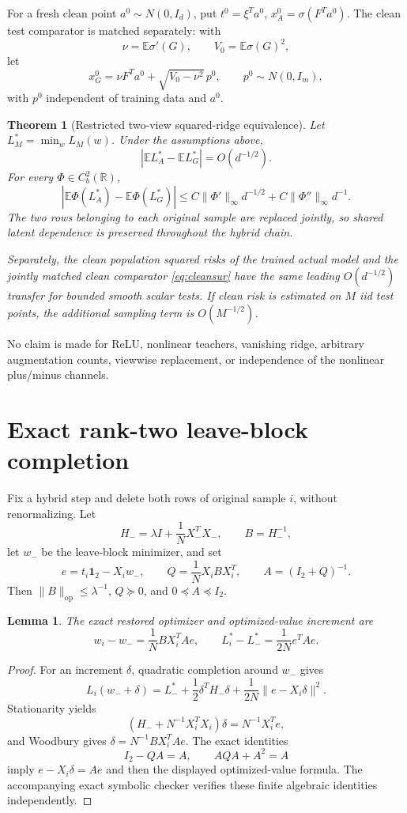\documentclass[11pt]{article}
\newtheorem{theorem}{Theorem}
\newtheorem{lemma}{Lemma}
\newcommand{\E}{\mathbb E}
\newcommand{\R}{\mathbb R}
\newcommand{\op}{\mathrm{op}}
\begin{document}
For a fresh clean point \(a^0\sim N(0,I_d)\), put \(t^0=\xi^Ta^0\), \(x_A^0=\sigma(F^Ta^0)\).  The clean test comparator is matched separately: with
\[
 \nu=\E\sigma'(G),\qquad V_0=\E\sigma(G)^2,
\]
let
\begin{equation}\label{eq:cleansur}
 x_G^0=\nu F^Ta^0+\sqrt{V_0-\nu^2}\,p^0,
 \qquad p^0\sim N(0,I_m),
\end{equation}
with \(p^0\) independent of training data and \(a^0\).

\begin{theorem}[Restricted two-view squared-ridge equivalence]\label{thm:main}
Let \(L_M^*=\min_w L_M(w)\).  Under the assumptions above,
\[
 |\E L_A^*-\E L_G^*|=O(d^{-1/2}).
\]
For every \(\Phi\in C_b^2(\R)\),
\[
 |\E\Phi(L_A^*)-\E\Phi(L_G^*)|
 \le C\|\Phi'\|_\infty d^{-1/2}+C\|\Phi''\|_\infty d^{-1}.
\]
The two rows belonging to each original sample are replaced jointly, so shared latent dependence is preserved throughout the hybrid chain.

Separately, the clean population squared risks of the trained actual model and the jointly matched clean comparator \eqref{eq:cleansur} have the same leading \(O(d^{-1/2})\) transfer for bounded smooth scalar tests.  If clean risk is estimated on \(M\) iid test points, the additional sampling term is \(O(M^{-1/2})\).
\end{theorem}

No claim is made for ReLU, nonlinear teachers, vanishing ridge, arbitrary augmentation counts, viewwise replacement, or independence of the nonlinear plus/minus channels.

\section{Exact rank-two leave-block completion}
Fix a hybrid step and delete both rows of original sample \(i\), without renormalizing.  Let
\[
 H_-=\lambda I+\frac1N X_-^TX_-,\qquad B=H_-^{-1},
\]
let \(w_-\) be the leave-block minimizer, and set
\[
 e=t_i\mathbf1_2-X_iw_-,\qquad Q=\frac1N X_iBX_i^T,\qquad A=(I_2+Q)^{-1}.
\]
Then \(\|B\|_{\op}\le\lambda^{-1}\), \(Q\succeq0\), and \(0\preceq A\preceq I_2\).

\begin{lemma}\label{lem:woodbury}
The exact restored optimizer and optimized-value increment are
\[
 w_i-w_-=\frac1N BX_i^TAe,
\qquad
 \boxed{L_i^*-L_-^*=\frac1{2N}e^TAe.}
\]
\end{lemma}
\begin{proof}
For an increment \(\delta\), quadratic completion around \(w_-\) gives
\[
 L_i(w_-+\delta)=L_-^*+\frac12\delta^TH_-\delta
 +\frac1{2N}\|e-X_i\delta\|^2.
\]
Stationarity yields
\[
 (H_-+N^{-1}X_i^TX_i)\delta=N^{-1}X_i^Te,
\]
and Woodbury gives \(\delta=N^{-1}BX_i^TAe\).  The exact identities
\[
 I_2-QA=A,
 \qquad
 AQA+A^2=A
\]
imply \(e-X_i\delta=Ae\) and then the displayed optimized-value formula.  The accompanying exact symbolic checker verifies these finite algebraic identities independently.
\end{proof}
\end{document}
